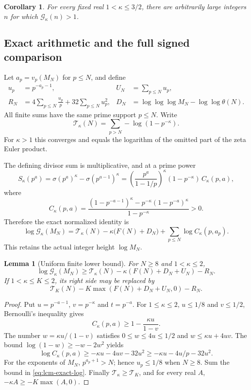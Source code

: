 \documentclass[11pt]{article}
\newtheorem{lemma}[theorem]{Lemma}
\newtheorem{corollary}[theorem]{Corollary}
\theoremstyle{definition}
\begin{document}
\begin{corollary}\label{cor:lcm-counterexamples}
For every fixed real $1<\kappa\le3/2$, there are arbitrarily large
integers $n$ for which $\mathcal G_\kappa(n)>1$.
\end{corollary}

\subsection{Exact arithmetic and the full signed comparison}
Let $a_p=v_p(M_N)$ for $p\le N$, and define
\begin{align*}
 u_p&=p^{-a_p-1},& U_N&=\sum_{p\le N}u_p,\\
 R_N&=4\sum_{p\le N}\frac{u_p}{p}
             +32\sum_{p\le N}u_p^2,&
 D_N&=\log\log\log M_N-\log\log\theta(N).
\end{align*}
All finite sums have the same prime support $p\le N$. Write
\[
 \mathcal T_\kappa(N)=
       \sum_{p>N}-\log(1-p^{-\kappa}).
\]
For $\kappa>1$ this converges and equals the logarithm of the
omitted part of the zeta Euler product.

The defining divisor sum is multiplicative, and at a prime power
\[
 S_\kappa(p^a)=\sigma(p^a)^\kappa-\sigma(p^{a-1})^\kappa
 =\left(\frac{p^a}{1-1/p}\right)^\kappa
       (1-p^{-\kappa})\,C_\kappa(p,a),
\]
where
\[
 C_\kappa(p,a)=
 \frac{(1-p^{-a-1})^\kappa-p^{-\kappa}(1-p^{-a})^\kappa}
      {1-p^{-\kappa}}>0.
\]
Therefore the exact normalized identity is
\begin{equation}\label{eq:lcm-exact-log}
 \log\mathcal G_\kappa(M_N)=
 \mathcal T_\kappa(N)-\kappa\bigl(F(N)+D_N\bigr)
       +\sum_{p\le N}\log C_\kappa(p,a_p).
\end{equation}
This retains the actual integer height $\log M_N$.

\begin{lemma}[Uniform finite lower bound]\label{lem:lcm-finite}
For $N\ge8$ and $1<\kappa\le2$,
\begin{equation}\label{eq:lcm-signed-bound}
 \log\mathcal G_\kappa(M_N)\ge
 \mathcal T_\kappa(N)-\kappa(F(N)+D_N+U_N)-R_N.
\end{equation}
If $1<\kappa\le K\le2$, its right side may be replaced by
\[
 \mathcal T_K(N)-K\max(F(N)+D_N+U_N,0)-R_N.
\]
\end{lemma}
\begin{proof}
Put $u=p^{-a-1}$, $v=p^{-\kappa}$ and $t=p^{-a}$.
For $1\le\kappa\le2$, $u\le1/8$ and $v\le1/2$, Bernoulli's
inequality gives
\[
 C_\kappa(p,a)\ge1-\frac{\kappa u}{1-v}.
\]
The number $w=\kappa u/(1-v)$ satisfies $0\le w\le4u\le1/2$
and $w\le\kappa u+4uv$. The bound
$\log(1-w)\ge-w-2w^2$ yields
\[
 \log C_\kappa(p,a)\ge-\kappa u-4uv-32u^2
                  \ge-\kappa u-4u/p-32u^2.
\]
For the exponents of $M_N$, $p^{a_p+1}>N$; hence $u_p\le1/8$
when $N\ge8$. Sum the bound in \eqref{eq:lcm-exact-log}.
Finally $\mathcal T_\kappa\ge\mathcal T_K$, and for every real $A$,
$-\kappa A\ge-K\max(A,0)$.
\end{proof}
\end{document}
